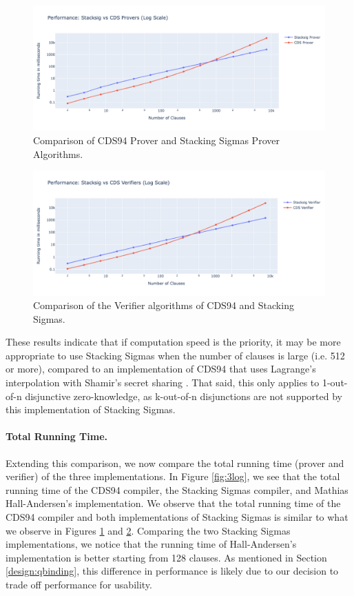 \begin{figure}[h]
  \centering
  \includegraphics[width=0.9\linewidth]{../assets/plots/vs_provers.png}
  \caption{Comparison of CDS94 Prover and Stacking Sigmas Prover Algorithms.}
  \label{fig:provers_vs}
\end{figure}

\begin{figure}[H]
  \centering
  \includegraphics[width=\linewidth]{../assets/plots/vs_verifiers.png}
  \caption{Comparison of the Verifier algorithms of CDS94 and Stacking Sigmas.}
  \label{fig:verifiers_vs}
\end{figure}

These results indicate that if computation speed is the priority,
 it may be more appropriate to use Stacking Sigmas 
when the number of clauses is large (i.e. 512 or more), compared to an implementation of 
CDS94 that uses Lagrange's interpolation \cite{lagrange} with Shamir's secret sharing 
\cite{DBLP:journals/cacm/Shamir79}. That said, this only applies to 1-out-of-n 
disjunctive zero-knowledge, as k-out-of-n disjunctions are not supported by this 
implementation of Stacking Sigmas.

\paragraph{Total Running Time.} Extending this comparison, we now compare the total running time (prover and verifier)
of the three implementations. In Figure \ref{fig:3log}, we see that the total running time of the CDS94 compiler, the Stacking Sigmas compiler, and Mathias Hall-Andersen's 
implementation. We observe that the total running time of the CDS94 compiler and both 
implementations of Stacking Sigmas is similar to what we observe in 
Figures \ref{fig:provers_vs} and \ref{fig:verifiers_vs}. Comparing the two 
Stacking Sigmas implementations, we notice that the running time of Hall-Andersen's 
implementation is better starting from 128 clauses. As mentioned in Section 
\ref{design:qbinding}, this difference in performance is likely due to our 
decision to trade off performance for usability.



